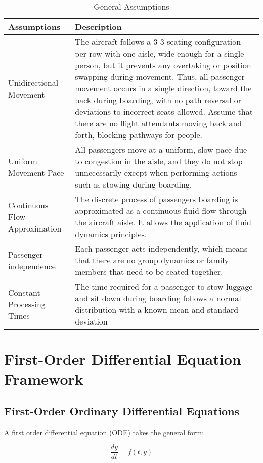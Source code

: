 \documentclass[12pt]{article}
\begin{document}
\begin{table}[h]
\centering
\caption{General Assumptions}
\begin{tabular}{p{}p{}}
\toprule
\textbf{Assumptions} & \textbf{Description} \\
\midrule
Unidirectional Movement & The aircraft follows a 3-3 seating configuration per row with one aisle, wide enough for a single person, but it prevents any overtaking or position swapping during movement. Thus, all passenger movement occurs in a single direction, toward the back during boarding, with no path reversal or deviations to incorrect seats allowed. Assume that there are no flight attendants moving back and forth, blocking pathways for people. \\
\addlinespace
Uniform Movement Pace & All passengers move at a uniform, slow pace due to congestion in the aisle, and they do not stop unnecessarily except when performing actions such as stowing during boarding. \\
\addlinespace
Continuous Flow Approximation & The discrete process of passengers boarding is approximated as a continuous fluid flow through the aircraft aisle. It allows the application of fluid dynamics principles. \\
\addlinespace
Passenger independence & Each passenger acts independently, which means that there are no group dynamics or family members that need to be seated together. \\
\addlinespace
Constant Processing Times & The time required for a passenger to stow luggage and sit down during boarding follows a normal distribution with a known mean and standard deviation \\
\bottomrule
\end{tabular}
\label{tab:assumptions}
\end{table}

\section{First-Order Differential Equation Framework}
\subsection{First-Order Ordinary Differential Equations}

A first order differential equation (ODE) takes the general form:

\begin{equation}
\frac{dy}{dt} = f(t, y)
\end{equation}
\end{document}

